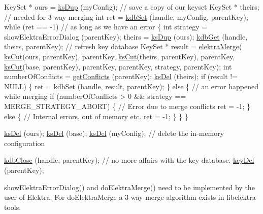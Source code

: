 \begin{DoxyCodeInclude}
KeySet * ours = \hyperlink{group__keyset_gac59e4b328245463f1451f68d5106151c}{ksDup} (myConfig); \textcolor{comment}{// save a copy of our keyset}
KeySet * theirs;                  \textcolor{comment}{// needed for 3-way merging}
\textcolor{keywordtype}{int} ret = \hyperlink{group__kdb_ga11436b058408f83d303ca5e996832bcf}{kdbSet} (handle, myConfig, parentKey);
\textcolor{keywordflow}{while} (ret == -1) \textcolor{comment}{// as long as we have an error}
\{
        \textcolor{keywordtype}{int} strategy = showElektraErrorDialog (parentKey);
        theirs = \hyperlink{group__keyset_gac59e4b328245463f1451f68d5106151c}{ksDup} (ours);
        \hyperlink{group__kdb_ga28e385fd9cb7ccfe0b2f1ed2f62453a1}{kdbGet} (handle, theirs, parentKey); \textcolor{comment}{// refresh key database}
        KeySet * result = \hyperlink{kdbmerge_8h_a5cb2bdc8c7e955afcd37c7fce5de6cf9}{elektraMerge}(
                \hyperlink{group__keyset_ga6b00cf82b59af4d883a9bad6cf4a4a4a}{ksCut}(ours, parentKey), parentKey,
                \hyperlink{group__keyset_ga6b00cf82b59af4d883a9bad6cf4a4a4a}{ksCut}(theirs, parentKey), parentKey,
                \hyperlink{group__keyset_ga6b00cf82b59af4d883a9bad6cf4a4a4a}{ksCut}(base, parentKey), parentKey,
                parentKey, strategy, parentKey);
        \textcolor{keywordtype}{int} numberOfConflicts = \hyperlink{kdbmerge_8h_aeeff18da6e6459f72807bdd7d4767a55}{getConflicts} (parentKey);
        \hyperlink{group__keyset_ga27e5c16473b02a422238c8d970db7ac8}{ksDel} (theirs);
        \textcolor{keywordflow}{if} (result != NULL) \{
                ret = \hyperlink{group__kdb_ga11436b058408f83d303ca5e996832bcf}{kdbSet} (handle, result, parentKey);
        \} \textcolor{keywordflow}{else} \{
                \textcolor{comment}{// an error happened while merging}
                \textcolor{keywordflow}{if} (numberOfConflicts > 0 && strategy == MERGE\_STRATEGY\_ABORT)
                \{
                        \textcolor{comment}{// Error due to merge conflicts}
                        ret = -1;
                \}
                \textcolor{keywordflow}{else}
                \{
                        \textcolor{comment}{// Internal errors, out of memory etc.}
                        ret = -1;
                \}
        \}
\}


\hyperlink{group__keyset_ga27e5c16473b02a422238c8d970db7ac8}{ksDel} (ours);
\hyperlink{group__keyset_ga27e5c16473b02a422238c8d970db7ac8}{ksDel} (base);
\hyperlink{group__keyset_ga27e5c16473b02a422238c8d970db7ac8}{ksDel} (myConfig); \textcolor{comment}{// delete the in-memory configuration}

\hyperlink{group__kdb_gadb54dc9fda17ee07deb9444df745c96f}{kdbClose} (handle, parentKey); \textcolor{comment}{// no more affairs with the key database.}
\hyperlink{group__key_ga3df95bbc2494e3e6703ece5639be5bb1}{keyDel} (parentKey);
\end{DoxyCodeInclude}
 show\+Elektra\+Error\+Dialog() and do\+Elektra\+Merge() need to be implemented by the user of Elektra. For do\+Elektra\+Merge a 3-\/way merge algorithm exists in libelektra-\/tools.


